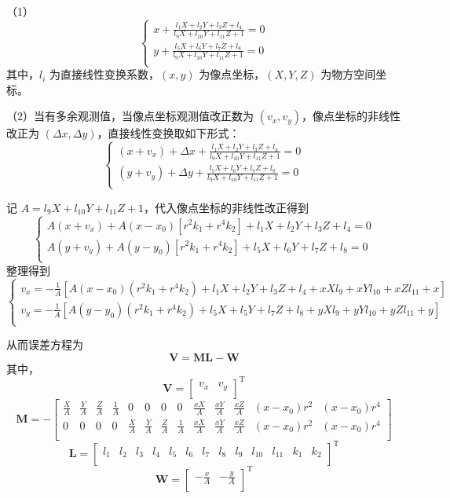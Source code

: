 \documentclass[a4paper]{ctexart}
\newtheorem*{sol}{\hskip 2em 解}
\begin{document}
\begin{sol}
（1）$$
\begin{cases}
	x+\frac{l_1X+l_2Y+l_3Z+l_4}{l_9X+l_{10}Y+l_{11}Z+1}=0\\
	y+\frac{l_5X+l_6Y+l_7Z+l_8}{l_9X+l_{10}Y+l_{11}Z+1}=0\\
\end{cases}
$$
其中，$l_i$ 为直接线性变换系数，$(x,y)$ 为像点坐标，$(X,Y,Z)$ 为物方空间坐标。

（2）当有多余观测值，当像点坐标观测值改正数为 $(v_x,v_y)$，像点坐标的非线性改正为 $(\Delta x,\Delta y)$，直接线性变换取如下形式：
$$
\begin{cases}
	\left( x+v_x \right) +\Delta x+\frac{l_1X+l_2Y+l_3Z+l_4}{l_9X+l_{10}Y+l_{11}Z+1}=0\\
	\left( y+v_y \right) +\Delta y+\frac{l_5X+l_6Y+l_7Z+l_8}{l_9X+l_{10}Y+l_{11}Z+1}=0\\
\end{cases}
$$

记 $A=l_9X+l_{10}Y+l_{11}Z+1$，代入像点坐标的非线性改正得到
$$
\begin{cases}
	A\left( x+v_x \right) +A\left( x-x_0 \right) \left[ r^2k_1+r^4k_2 \right] +l_1X+l_2Y+l_3Z+l_4=0\\
	A\left( y+v_y \right) +A\left( y-y_0 \right) \left[ r^2k_1+r^4k_2 \right] +l_5X+l_6Y+l_7Z+l_8=0\\
\end{cases}
$$
整理得到 
$$
\begin{cases}
	v_x=-\frac{1}{A}\left[ A\left( x-x_0 \right) \left( r^2k_1+r^4k_2 \right) +l_1X+l_2Y+l_3Z+l_4+xXl_9+xYl_{10}+xZl_{11}+x \right]\\
	v_y=-\frac{1}{A}\left[ A\left( y-y_0 \right) \left( r^2k_1+r^4k_2 \right) +l_5X+l_5Y+l_7Z+l_8+yXl_9+yYl_{10}+yZl_{11}+y \right]\\
\end{cases}
$$

从而误差方程为
$$
\bm{V=ML-W}
$$
其中，
$$
\boldsymbol{V}=\left[ \begin{matrix}
	v_x&		v_y\\
\end{matrix} \right] ^{\mathrm{T}}
$$
$$
\boldsymbol{M}=-\left[ \begin{matrix}
	\frac{X}{A}&		\frac{Y}{A}&		\frac{Z}{A}&		\frac{1}{A}&		0&		0&		0&		0&		\frac{xX}{A}&		\frac{xY}{A}&		\frac{xZ}{A}&		\left( x-x_0 \right) r^2&		\left( x-x_0 \right) r^4\\
	0&		0&		0&		0&		\frac{X}{A}&		\frac{Y}{A}&		\frac{Z}{A}&		\frac{1}{A}&		\frac{xX}{A}&		\frac{xY}{A}&		\frac{xZ}{A}&		\left( x-x_0 \right) r^2&		\left( x-x_0 \right) r^4\\
\end{matrix} \right] 
$$
$$
\boldsymbol{L}=\left[ \begin{matrix}
	l_1&		l_2&		l_3&		l_4&		l_5&		l_6&		l_7&		l_8&		l_9&		l_{10}&		l_{11}&		k_1&		k_2\\
\end{matrix} \right] ^{\mathrm{T}}
$$
$$
\boldsymbol{W}=\left[ \begin{matrix}
	-\frac{x}{A}&		-\frac{y}{A}\\
\end{matrix} \right] ^{\mathrm{T}}
$$
\end{sol}
\end{document}
